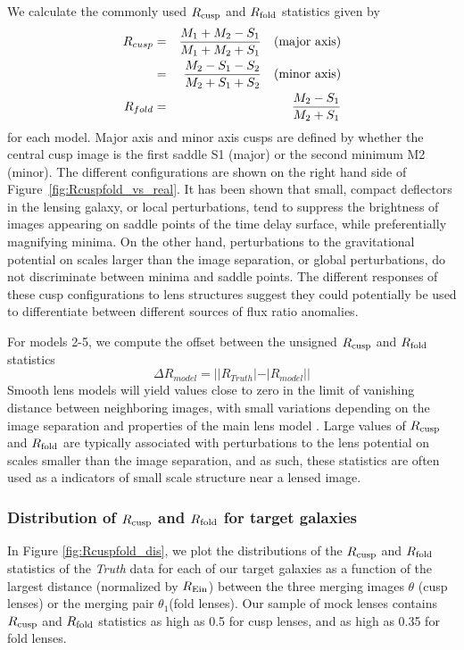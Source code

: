\noindent We calculate the commonly used $R_{\rm{cusp}}$ and $R_{\rm{fold}}$ statistics given by
%
\begin{eqnarray} \label{eq:rcuspfold1}
R_{cusp} &=& \dfrac{M_{1} + M_{2} - S_{1}}{M_{1} + M_{2} + S_{1}} \quad \rm{(major \ axis)} \\ \nonumber &=& \dfrac{M_2 - S_{1} - S_{2}}{M_{2} + S_{1} + S_{2}} \quad \rm{(minor \ axis)} \\\label{eq:rcuspfold2}R_{fold} &=& \frac{M_{2} - S_{1}}{M_{2} + S_{1}}
\end{eqnarray}
for each model. Major axis and minor axis cusps are defined by whether the central cusp image is the first saddle S1 (major) or the second minimum M2 (minor). The different configurations are shown on the right hand side of Figure~\ref{fig:Rcuspfold_vs_real}. It has been shown \citep{Schechter++02,Keeton03b} that small, compact deflectors in the lensing galaxy, or local perturbations, tend to suppress the brightness of images appearing on saddle points of the time delay surface, while preferentially magnifying minima. On the other hand, perturbations to the gravitational potential on scales larger than the image separation, or global perturbations, do not discriminate between minima and saddle points. The different responses of these cusp configurations to lens structures suggest they could potentially be used to differentiate between different sources of flux ratio anomalies.

For models 2-5, we compute the offset between the unsigned $R_{\rm{cusp}}$ and $R_{\rm{fold}}$ statistics
\begin{equation}
\nonumber \Delta R_{model} = ||R_{Truth}|- |R_{model}|| 
\end{equation}
Smooth lens models will yield values close to zero in the limit of vanishing distance between neighboring images, with small variations depending on the image separation and properties of the main lens model \citep{Keeton03,Keeton05}. Large values of $R_{\rm{cusp}}$ and $R_{\rm{fold}}$ are typically associated with perturbations to the lens potential on scales smaller than the image separation, and as such, these statistics are often used as a indicators of small scale structure near a lensed image.

\subsubsection{Distribution of $R_{\rm{cusp}}$ and $R_{\rm{fold}}$ for target galaxies}
In Figure \ref{fig:Rcuspfold_dis}, we plot the distributions of the $R_{\rm{cusp}}$ and $R_{\rm{fold}}$ statistics of the \textit{Truth} data for each of our target galaxies as a function of the largest distance (normalized by $R_{\rm{Ein}}$) between the three merging images $\theta$ (cusp lenses) or the merging pair $\theta_1$(fold lenses). Our sample of mock lenses contains $R_{\rm{cusp}}$ and $R_{\rm{fold}}$ statistics as high as 0.5 for cusp lenses, and as high as 0.35 for fold lenses.

